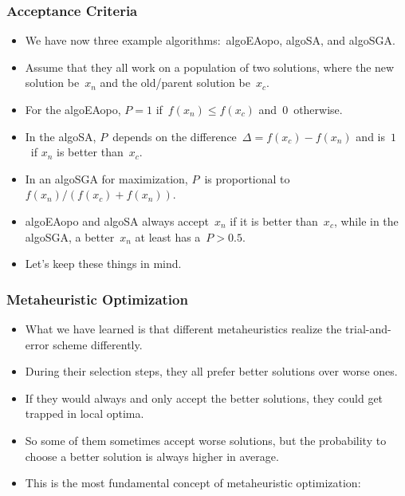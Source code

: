 \documentclass[aspectratio=169,mathserif,notheorems]{beamer}%
\begin{document}
%
\begin{frame}%
\frametitle{Acceptance Criteria}%
\begin{itemize}%
\item We have now three example algorithms:~\gls{algoEAopo}, \gls{algoSA}, and \gls{algoSGA}.%
%
\item<2-> Assume that they all work on a population of two solutions, where the new solution be~$x_n$ and the old/parent solution be~$x_c$.%
%
\item<3-> For the \gls{algoEAopo}, $P=1$ if~$f(x_n)\leq f(x_c)$ and~$0$~otherwise.%
%
\item<4-> In the \gls{algoSA}, $P$~depends on the difference~$\Delta=f(x_c)-f(x_n)$ and is~$1$~if $x_n$ is better than~$x_c$.%
%
\item<5-> In an \gls{algoSGA} for maximization, $P$~is proportional to~$f(x_n)/(f(x_c)+f(x_n))$.%
%
\item<7-> \gls{algoEAopo} and \gls{algoSA} always accept~$x_n$ if it is better than~$x_c$, while in the \gls{algoSGA}, a better~$x_n$ at least has a~$P>0.5$.%
%
\item<8-> Let's keep these things in mind.%
\end{itemize}%
\end{frame}%
%
\begin{frame}%
\frametitle{Metaheuristic Optimization}%
\begin{itemize}%
\item What we have learned is that different metaheuristics realize the trial-and-error scheme differently.%
\item<2-> During their selection steps, they all prefer better solutions over worse ones.%
\item<3-> If they would always and only accept the better solutions, they could get trapped in local optima.%
\item<4-> So some of them sometimes accept worse solutions, but the probability to choose a better solution is always higher in average.%
\item<5-> This is the most fundamental concept of metaheuristic optimization:%
\end{itemize}%
%
%
%
\end{frame}%
%
%
\end{document}
